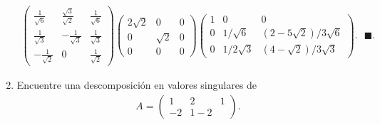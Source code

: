 \documentclass[11pt,letterpaper]{article}
\newcommand{\finf}{\blacksquare.}
\begin{document}
\begin{enumerate}
\begin{align*}
\begin{pmatrix}
\frac{1}{\sqrt{6}} & \frac{\sqrt{3}}{\sqrt{2}} & \frac{1}{\sqrt{6}}\\
\frac{1}{\sqrt{3}} & -\frac{1}{\sqrt{3}} & \frac{1}{\sqrt{3}}\\
-\frac{1}{\sqrt{2}} & 0 & \frac{1}{\sqrt{2}}
\end{pmatrix}
\begin{pmatrix}
2\sqrt{2} & 0 & 0\\
0 & \sqrt{2} & 0\\
0 & 0 & 0
\end{pmatrix}
\begin{pmatrix}
1 & 0 & 0\\ 
0 &  1/\sqrt{6} & (2-5\sqrt{2})/3\sqrt{6} \\
0 & 1/2\sqrt{3} & (4-\sqrt{2})/3\sqrt{3}
\end{pmatrix}. \ \ \ \finf
\end{align*}

\item  Encuentre una descomposición en valores singulares de 
\begin{align*}
A=\begin{pmatrix}
1 & 2 & 1 \\
-2 & 1 -2 
\end{pmatrix}.
\end{align*}


\end{enumerate}
\end{document}
